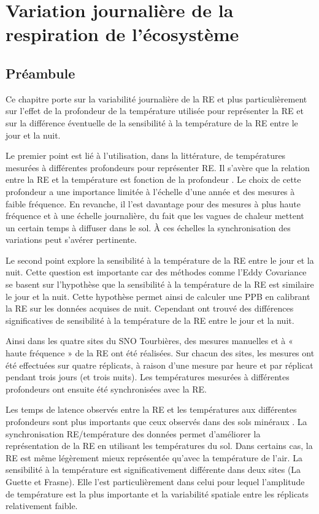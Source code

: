 \singlespacing
\chapter{Variation journalière de la respiration de l'écosystème}
\label{ch:ch5}

\minitoc

\newpage

\doublespacing
\section{Préambule}

Ce chapitre porte sur la variabilité journalière de la RE et plus particulièrement sur l'effet de la profondeur de la température utilisée pour représenter la RE et sur la différence éventuelle de la sensibilité à la température de la RE entre le jour et la nuit.

Le premier point est lié à l'utilisation, dans la littérature, de températures mesurées à différentes profondeurs pour représenter RE.
Il s'avère que la relation entre la RE et la température est fonction de la profondeur \citep{pavelka2007,graf2008}.
Le choix de cette profondeur a une importance limitée à l'échelle d'une année et des mesures à faible fréquence.
En revanche, il l'est davantage pour des mesures à plus haute fréquence et à une échelle journalière, du fait que les vagues de chaleur mettent un certain temps à diffuser dans le sol.
À ces échelles la synchronisation des variations peut s'avérer pertinente. 

Le second point explore la sensibilité à la température de la RE entre le jour et la nuit.
Cette question est importante car des méthodes comme l'Eddy Covariance se basent sur l'hypothèse que la sensibilité à la température de la RE est similaire le jour et la nuit.
Cette hypothèse permet ainsi de calculer une PPB en calibrant la RE sur les données acquises de nuit.
Cependant \citet{juszczak2012} ont trouvé des différences significatives de sensibilité à la température de la RE entre le jour et la nuit.

Ainsi dans les quatre sites du SNO Tourbières, des mesures manuelles et à « haute fréquence » de la RE ont été réalisées.
Sur chacun des sites, les mesures ont été effectuées sur quatre réplicats, à raison d'une mesure par heure et par réplicat pendant trois jours (et trois nuits).
Les températures mesurées à différentes profondeurs ont ensuite été synchronisées avec la RE.

Les temps de latence observés entre la RE et les températures aux différentes profondeurs sont plus importants que ceux observés dans des sols minéraux \citep{pavelka2007}.
La synchronisation RE/température des données permet d'améliorer la représentation de la RE en utilisant les températures du sol.
Dans certains cas, la RE est même légèrement mieux représentée qu'avec la température de l'air.
La sensibilité à la température est significativement différente dans deux sites (La Guette et Frasne).
Elle l'est particulièrement dans celui pour lequel l'amplitude de température est la plus importante et la variabilité spatiale entre les réplicats relativement faible.

